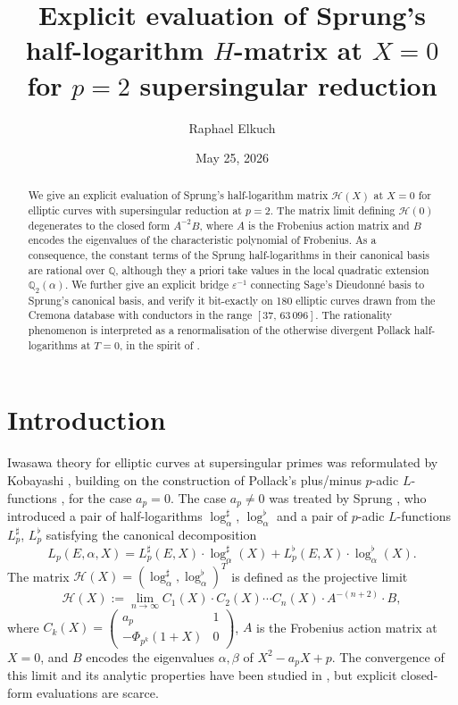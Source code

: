 \documentclass[11pt,a4paper]{amsart}
\title[Sprung's $H$-matrix at $X=0$ for $p=2$ supersingular]{Explicit evaluation of Sprung's half-logarithm $H$-matrix at $X=0$ for $p=2$ supersingular reduction}
\author{Raphael Elkuch}
\date{May 25, 2026}
\theoremstyle{definition}
\newcommand{\Q}{\mathbb{Q}}
\newcommand{\eps}{\varepsilon}
\newcommand{\Hcal}{\mathcal{H}}
\begin{document}
\begin{abstract}
We give an explicit evaluation of Sprung's half-logarithm matrix $\Hcal(X)$ at $X=0$ for elliptic curves with supersingular reduction at $p=2$. The matrix limit defining $\Hcal(0)$ degenerates to the closed form $A^{-2}B$, where $A$ is the Frobenius action matrix and $B$ encodes the eigenvalues of the characteristic polynomial of Frobenius. As a consequence, the constant terms of the Sprung half-logarithms in their canonical basis are rational over $\Q$, although they a priori take values in the local quadratic extension $\Q_2(\alpha)$. We further give an explicit bridge $\eps^{-1}$ connecting Sage's Dieudonné basis to Sprung's canonical basis, and verify it bit-exactly on 180 elliptic curves drawn from the Cremona database with conductors in the range $[37,\,63\,096]$. The rationality phenomenon is interpreted as a renormalisation of the otherwise divergent Pollack half-logarithms at $T=0$, in the spirit of \cite[Remark 6.16]{Sprung2012}.
\end{abstract}

\maketitle

\section{Introduction}\label{sec:intro}

Iwasawa theory for elliptic curves at supersingular primes was reformulated by Kobayashi \cite{Kobayashi2003}, building on the construction of Pollack's plus/minus $p$-adic $L$-functions \cite{Pollack2003}, for the case $a_p = 0$. The case $a_p \neq 0$ was treated by Sprung \cite{Sprung2012}, who introduced a pair of half-logarithms $\log_\alpha^\sharp$, $\log_\alpha^\flat$ and a pair of $p$-adic $L$-functions $L_p^\sharp$, $L_p^\flat$ satisfying the canonical decomposition
\begin{equation}\label{eq:sprung-main}
L_p(E, \alpha, X) = L_p^\sharp(E, X) \cdot \log_\alpha^\sharp(X) + L_p^\flat(E, X) \cdot \log_\alpha^\flat(X).
\end{equation}
The matrix $\Hcal(X) = (\log_\alpha^\sharp, \log_\alpha^\flat)^T$ is defined as the projective limit
\begin{equation}\label{eq:H-def}
\Hcal(X) := \lim_{n \to \infty} C_1(X) \cdot C_2(X) \cdots C_n(X) \cdot A^{-(n+2)} \cdot B,
\end{equation}
where $C_k(X) = \begin{pmatrix} a_p & 1 \\ -\Phi_{p^k}(1+X) & 0 \end{pmatrix}$, $A$ is the Frobenius action matrix at $X=0$, and $B$ encodes the eigenvalues $\alpha, \beta$ of $X^2 - a_p X + p$. The convergence of this limit and its analytic properties have been studied in \cite{Sprung2012, Sprung2016}, but explicit closed-form evaluations are scarce.
\end{document}
